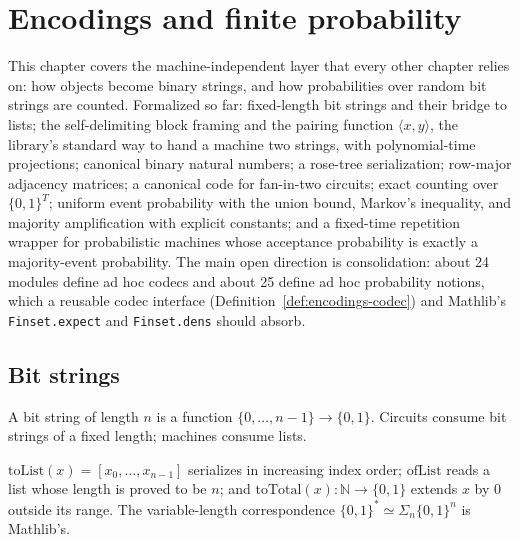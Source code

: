 \chapter{Encodings and finite probability}
\label{chap:encodings}

This chapter covers the machine-independent layer that every other chapter
relies on: how objects become binary strings, and how probabilities over random
bit strings are counted. Formalized so far: fixed-length bit strings and their
bridge to lists; the self-delimiting block framing and the pairing function
$\langle x, y \rangle$, the library's standard way to hand a machine two
strings, with polynomial-time projections; canonical binary natural numbers; a
rose-tree serialization; row-major adjacency matrices; a canonical code for
fan-in-two circuits; exact counting over $\{0,1\}^T$; uniform event
probability with the union bound, Markov's inequality, and majority
amplification with explicit constants; and a fixed-time repetition wrapper for
probabilistic machines whose acceptance probability is exactly a
majority-event probability. The main open direction is consolidation: about 24
modules define ad hoc codecs and about 25 define ad hoc probability notions,
which a reusable codec interface (Definition~\ref{def:encodings-codec}) and
Mathlib's \texttt{Finset.expect} and \texttt{Finset.dens} should absorb.

\section{Bit strings}

\begin{definition}
  \label{def:bitstring}
  \leanok
  A bit string of length $n$ is a function $\{0, \dots, n-1\} \to \{0,1\}$.
  Circuits consume bit strings of a fixed length; machines consume lists.
\end{definition}

\begin{definition}
  \label{def:encodings-bitstring-list}
  \leanok
  $\mathrm{toList}(x) = [x_0, \dots, x_{n-1}]$ serializes in increasing index
  order; $\mathrm{ofList}$ reads a list whose length is proved to be $n$; and
  $\mathrm{toTotal}(x) : \mathbb{N} \to \{0,1\}$ extends $x$ by $0$ outside
  its range. The variable-length correspondence
  $\{0,1\}^* \simeq \Sigma_n \{0,1\}^n$ is Mathlib's.
\end{definition}

